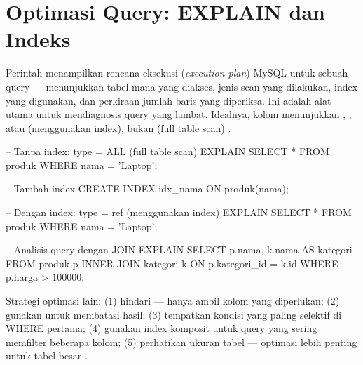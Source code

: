 \section{Optimasi Query: EXPLAIN dan Indeks}

Perintah  menampilkan rencana eksekusi (\textit{execution plan}) MySQL untuk sebuah query --- menunjukkan tabel mana yang diakses, jenis scan yang dilakukan, index yang digunakan, dan perkiraan jumlah baris yang diperiksa. Ini adalah alat utama untuk mendiagnosis query yang lambat. Idealnya, kolom  menunjukkan , , atau  (menggunakan index), bukan  (full table scan) \cite{mysqlDocs}.

\begin{webcode}[language=SQL, caption={Menggunakan EXPLAIN untuk analisis query}]
-- Tanpa index: type = ALL (full table scan)
EXPLAIN SELECT * FROM produk WHERE nama = 'Laptop';

-- Tambah index
CREATE INDEX idx_nama ON produk(nama);

-- Dengan index: type = ref (menggunakan index)
EXPLAIN SELECT * FROM produk WHERE nama = 'Laptop';

-- Analisis query dengan JOIN
EXPLAIN SELECT p.nama, k.nama AS kategori
FROM produk p
INNER JOIN kategori k ON p.kategori_id = k.id
WHERE p.harga > 100000;
\end{webcode}

Strategi optimasi lain: (1) hindari  --- hanya ambil kolom yang diperlukan; (2) gunakan  untuk membatasi hasil; (3) tempatkan kondisi yang paling selektif di WHERE pertama; (4) gunakan index komposit untuk query yang sering memfilter beberapa kolom; (5) perhatikan ukuran tabel --- optimasi lebih penting untuk tabel besar \cite{mysqlGettingStarted}.

